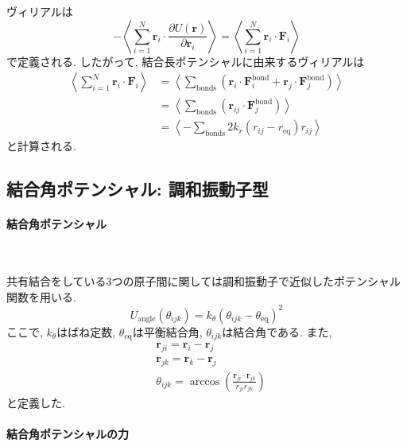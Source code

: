 ヴィリアルは
\begin{equation}
  -\left\langle
   \sum_{i=1}^{N} \bm{r}_{i}
   \cdot \frac{\partial U(\bm{r})}{\partial \bm{r}_{i}}
   \right\rangle
=
   \left\langle
   \sum_{i=1}^{N} \bm{r}_{i}
   \cdot \bm{F}_{i}
   \right\rangle
 \label{eq:BioModel5}
\end{equation}
で定義される. したがって, 結合長ポテンシャルに由来するヴィリアルは
\begin{align}
 \left\langle
   \sum_{i=1}^{N} \bm{r}_{i}
   \cdot \bm{F}_{i}
 \right\rangle
 &=
 \left\langle
   \sum_{\mathrm{bonds}}
   \left(
     \bm{r}_{i} \cdot \bm{F}_{i}^{\mathrm{bond}}
   + \bm{r}_{j} \cdot \bm{F}_{j}^{\mathrm{bond}}
 \right)
 \right\rangle
 \\
  &=
 \left\langle
   \sum_{\mathrm{bonds}}
   \left(
     \bm{r}_{ij} \cdot \bm{F}_{j}^{\mathrm{bond}}
 \right)
 \right\rangle
 \\
 &=
 \left\langle
      -\sum_{\mathrm{bonds}} 2 k_{r} (r_{ij} - r_{\mathrm{eq}}) r_{ij}
 \right\rangle
 \label{eq:BioModel6}
\end{align}
と計算される.

\clearpage
\subsection{結合角ポテンシャル: 調和振動子型}
\paragraph{結合角ポテンシャル} \

共有結合をしている3つの原子間に関しては調和振動子で近似したポテンシャル関数を用いる. 
\begin{equation}
    U_{\mathrm{angle}}(\theta_{ijk})
  = k_{\theta} (\theta_{ijk} - \theta_{\mathrm{eq}})^{2}
 \label{eq:BioModel7}
\end{equation}
ここで, $k_{\theta}$はばね定数, $\theta_{\mathrm{eq}}$は平衡結合角, 
$\theta_{ijk}$は結合角である. 
また, 
\begin{align}
  &\bm{r}_{ji}
 = \bm{r}_{i} - \bm{r}_{j}
 \label{eq:BioModel8}
 \\
  &\bm{r}_{jk}
 = \bm{r}_{k} - \bm{r}_{j}
 \label{eq:BioModel9}
 \\
  &\theta_{ijk}
 = \arccos \left(
                  \frac{\bm{r}_{ji} \cdot \bm{r}_{jk}}{r_{ji} r_{jk}}
           \right)
 \label{eq:BioModel10}
\end{align}
と定義した.

\paragraph{結合角ポテンシャルの力} \

